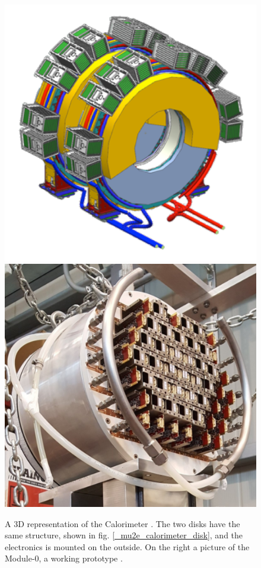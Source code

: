 \documentclass[12pt,a4paper,openright, oneside, titlepage]{book} %
\begin{document}
\begin{figure}[h!]
\centering
\includegraphics[scale=0.5]{mu2e_calorimeter}
\includegraphics[scale=0.7]{mu2e_calorimeter_Module0}
\caption[Electromagnetic Calorimeter]{A 3D representation of the Calorimeter \cite{Calorimeter:2018}. The two disks have the same structure, shown in fig. \ref{_mu2e_calorimeter_disk}, and the electronics is mounted on the outside. On the right a picture of the Module-0, a working prototype \cite{Donghia:2019}.}
\label{_mu2e_calorimeter}
\end{figure}
\end{document}
